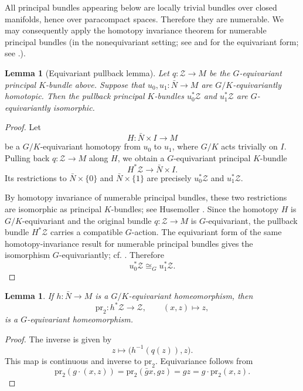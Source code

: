 \documentclass[11pt,a4paper]{article}
\numberwithin{equation}{section}
\newtheorem{lemma}[definition]{Lemma}
\theoremstyle{named}
\begin{document}
All principal bundles appearing below are locally trivial bundles over closed manifolds, hence over paracompact spaces. Therefore they are numerable. We may consequently apply the homotopy invariance theorem for numerable principal bundles (in the nonequivariant setting; see \cite{husemoller} and for the equivariant form; see \cite{lashofmay}.).

\begin{lemma}[Equivariant pullback lemma]
\label{lem:equiv_pullback}
Let
\(q:\mathcal Z\to M\) be the \(G\)-equivariant principal \(K\)-bundle above. Suppose that \(u_0,u_1:\bar N\to M\) are \(G/K\)-equivariantly homotopic. Then the pullback principal \(K\)-bundles \(u_0^*\mathcal Z\) and \(u_1^*\mathcal Z\) are \(G\)-equivariantly isomorphic.
\end{lemma}
\begin{proof}
Let
\[
    H:\bar N\times I\longrightarrow M
\]
be a \(G/K\)-equivariant homotopy from \(u_0\) to \(u_1\), where \(G/K\) acts trivially on \(I\). Pulling back \(q:\mathcal Z\to M\) along \(H\), we obtain a \(G\)-equivariant principal \(K\)-bundle
\[
    H^*\mathcal Z\longrightarrow \bar N\times I.
\]
Its restrictions to \(\bar N\times\{0\}\) and \(\bar N\times\{1\}\) are precisely \(u_0^*\mathcal Z\) and \(u_1^*\mathcal Z\).

By homotopy invariance of numerable principal bundles, these two restrictions are isomorphic as principal \(K\)-bundles; see Husemoller \cite[Ch.~4, Theorem~9.9]{husemoller}. Since the homotopy \(H\) is \(G/K\)-equivariant and the original bundle \(q:\mathcal Z\to M\) is \(G\)-equivariant, the pullback bundle \(H^*\mathcal Z\) carries a compatible \(G\)-action. The equivariant form of the same homotopy-invariance result for numerable principal bundles gives the isomorphism \(G\)-equivariantly; cf. \cite[Corollary~7]{lashofmay}. Therefore
\[
    u_0^*\mathcal Z\cong_G u_1^*\mathcal Z.
\]
\end{proof}

\begin{lemma}
\label{lem:pullback_homeo}
If \(h:\bar N\to M\) is a \(G/K\)-equivariant homeomorphism, then
\[
    \mathrm{pr}_2:h^*\mathcal Z\longrightarrow \mathcal Z,
    \qquad
    (x,z)\mapsto z,
\]
is a \(G\)-equivariant homeomorphism.
\end{lemma}

\begin{proof}
The inverse is given by $$z\longmapsto \bigl(h^{-1}(q(z)),z\bigr).$$ This map is continuous and inverse to \(\mathrm{pr}_2\). Equivariance follows from
\[
    \mathrm{pr}_2(g\cdot(x,z))
    =
    \mathrm{pr}_2(\bar g x,gz)
    =
    gz
    =
    g\cdot \mathrm{pr}_2(x,z).
\]
\end{proof}
\end{document}
